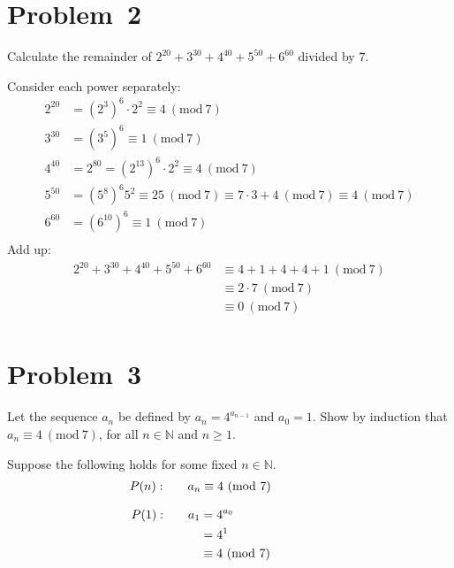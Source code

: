 \documentclass[12pt]{article}
\newcommand{\modulo}[1]{~(\mathrm{mod}~#1)}
\begin{document}
\section*{Problem~2}
\begin{question}
Calculate the remainder of $2^{20}+3^{30}+4^{40}+5^{50}+6^{60}$ divided by $7$. 
\end{question}
Consider each power separately:
\begin{align*}
2^{20} 
 & = (2^{3})^{6} \cdot 2^{2} 
   \equiv 4 \modulo{7} \\
3^{30} 
 & = (3^{5})^{6}
   \equiv 1 \modulo{7} \\
4^{40} 
 & = 2^{80}
   = (2^{13})^{6} \cdot 2^{2}
   \equiv 4 \modulo{7} \\
5^{50} 
 & = (5^{8})^{6} 5^{2}
   \equiv 25 \modulo{7} 
   \equiv 7 \cdot 3 + 4 \modulo{7} 
   \equiv 4 \modulo{7} \\
6^{60} 
 & = (6^{10})^{6}
   \equiv 1 \modulo{7} \\
\end{align*}
Add up:
\begin{align*}
2^{20}+3^{30}+4^{40}+5^{50}+6^{60} 
 & \equiv 4 + 1 + 4 + 4 + 1 \modulo{7} \\
 &  \equiv 2 \cdot 7  \modulo{7} \\
 & \equiv 0 \modulo{7} \\
\end{align*}


\clearpage
\section*{Problem~3}
\begin{question}
Let the sequence $a_{n}$ be defined by $a_{n}=4^{a_{n-1}}$ and $a_{0}=1$. Show by induction that $a_{n}\equiv4\modulo{7}$, for all $n\in\mathbb{N}$ and $n\geq1$.
\end{question}

Suppose the following holds for some fixed $n\in\mathbb{N}$.
\begin{align*}
\mathllap{P(n): \hspace{2em}}
  a_{n} \equiv 4 \modulo{7}
\end{align*}

\begin{align*}
\mathllap{P(1): \hspace{2em}}
a_{1} 
  & = 4^{a_{0}} \\
  & = 4^{1} \\
  & \equiv 4 \modulo{7}
\end{align*}
\end{document}
